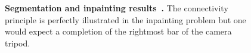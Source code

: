 \begin{figure}
\begin{tabular}{ccc}
\end{tabular}
\caption{\textbf{Segmentation and inpainting results~\cite{nieuwenhuis14efficient}.} The connectivity principle is perfectly illustrated in the inpainting problem but one would expect a completion of the rightmost bar of the camera tripod. }
\label{ch3:fig:nieuweinhuis-results}
\end{figure}



%
%
%
%
%
%
%
%
%
%
%
%
%
%
%

